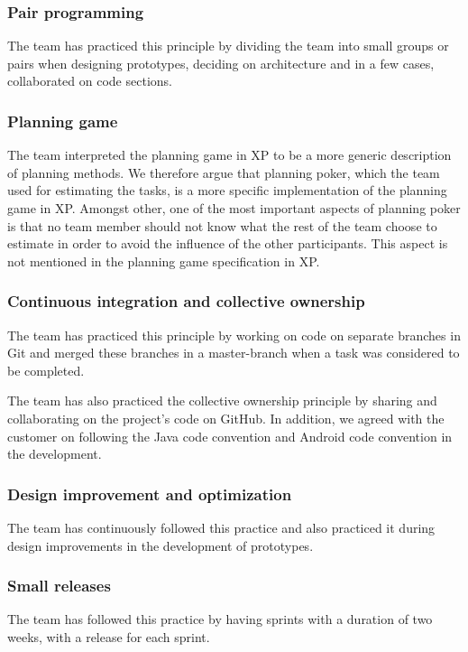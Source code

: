 \subsubsection{Pair programming}
The team has practiced this principle by dividing the team into small groups or pairs when designing prototypes, deciding on architecture and in a few cases, collaborated on code sections.

\subsubsection{Planning game}
The team interpreted the planning game in XP to be a more generic description of planning methods. We therefore argue that planning poker, which the team used for estimating the tasks, is a more specific implementation of the planning game in XP. Amongst other, one of the most important aspects of planning poker is that no team member should not know what the rest of the team choose to estimate in order to avoid the influence of the other participants. This aspect is not mentioned in the planning game specification in XP.

\subsubsection{Continuous integration and collective ownership}
The team has practiced this principle by working on code on separate branches in Git and merged these branches in a master-branch when a task was considered to be completed.

The team has also practiced the collective ownership principle by sharing and collaborating on the project's code on GitHub. In addition, we agreed with the customer on following the Java code convention and Android code convention in the development.

\subsubsection{Design improvement and optimization}
The team has continuously followed this practice and also practiced it during design improvements in the development of prototypes.
 
\subsubsection{Small releases}
The team has followed this practice by having sprints with a duration of two weeks, with a release for each sprint.


